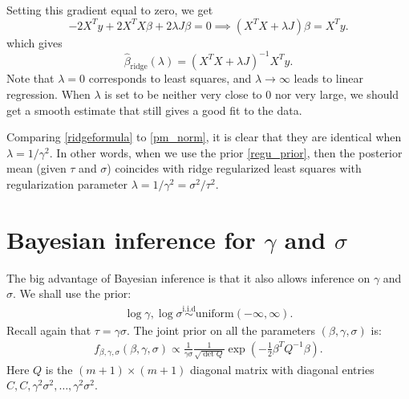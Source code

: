 \documentclass{scrartcl}
\newcommand{\ridge}{{\hat{\beta}_{\text{ridge}}(\lambda)}}
\begin{document}
Setting this gradient equal to zero, we get 
\begin{equation*}
  -2 X^T y + 2 X^T X \beta + 2 \lambda J \beta = 0 \implies \left(X^T
    X + \lambda J \right) \beta = X^T y. 
\end{equation*}
which gives
\begin{equation}\label{ridgeformula}
  \ridge = (X^T X + \lambda J)^{-1} X^T y. 
\end{equation}
Note that $\lambda = 0$ corresponds to least squares, and $\lambda
\rightarrow \infty$ leads to linear regression. When $\lambda$ is set
to be neither very close to 0 nor very large, we should get a smooth
estimate that still gives a good fit to the data. 

Comparing \eqref{ridgeformula} to \eqref{pm_norm}, it is clear that
they are identical when $\lambda = 1/\gamma^2$. In other words, when
we use the prior \eqref{regu_prior}, then the posterior mean (given
$\tau$ and $\sigma$) coincides with ridge regularized least squares
with regularization parameter $\lambda = 1/\gamma^2 =
\sigma^2/\tau^2$.

\section{Bayesian inference for $\gamma$ and $\sigma$} 

The big advantage of Bayesian inference is that it also allows
inference on $\gamma$ and $\sigma$. We shall use the prior: 
\begin{align*}
  \log \gamma, \log \sigma \overset{\text{i.i.d}}{\sim}
  \text{uniform}(-\infty, \infty).
\end{align*}
Recall again that $\tau = \gamma \sigma$. The joint prior on all the
parameters $(\beta, \gamma, \sigma)$ is:
\begin{align*}
  f_{\beta, \gamma, \sigma}(\beta, \gamma, \sigma) \propto
  \frac{1}{\gamma \sigma} \frac{1}{\sqrt{\det Q}} \exp
  \left(-\frac{1}{2} \beta^T Q^{-1} \beta \right). 
\end{align*}
Here $Q$ is the $(m+1) \times (m+1)$ diagonal matrix with diagonal
entries $C, C, \gamma^2 \sigma^2, \dots, \gamma^2 \sigma^2$.
\end{document}

